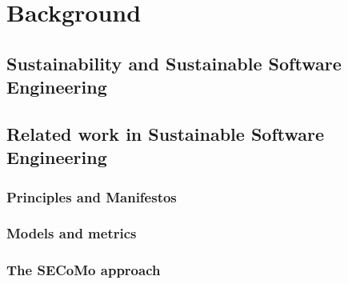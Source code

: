 \chapter{Background} %

\section{Sustainability and Sustainable Software Engineering}


\section{Related work in Sustainable Software Engineering}
\subsection{Principles and Manifestos}

\subsection{Models and metrics}


\subsection{The SECoMo approach}

